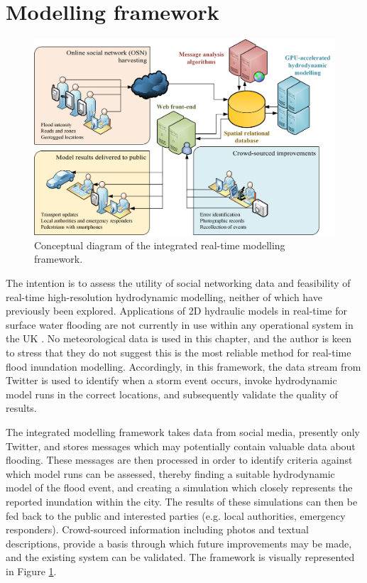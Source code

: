 \section{Modelling framework}

\begin{figure}[tpb]
	\centering
	\includegraphics[width=1.0\textwidth]{nowcasting-figures/nclsm-conceptual-diag.png}
	\caption{Conceptual diagram of the integrated real-time modelling framework.}
	\label{NclSM-Conceptual-Diag}
\end{figure}

The intention is to assess the utility of social networking data and feasibility of real-time high-resolution hydrodynamic modelling, neither of which have previously been explored. Applications of 2D hydraulic models in real-time for surface water flooding are not currently in use within any operational system in the UK \citep{Ghimire2013}. No meteorological data is used in this chapter, and the author is keen to stress that they do not suggest this is the most reliable method for real-time flood inundation modelling. Accordingly, in this framework, the data stream from Twitter is used to identify when a storm event occurs, invoke hydrodynamic model runs in the correct locations, and subsequently validate the quality of results.

The integrated modelling framework takes data from social media, presently only Twitter, and stores messages which may potentially contain valuable data about flooding. These messages are then processed in order to identify criteria against which model runs can be assessed, thereby finding a suitable hydrodynamic model of the flood event, and creating a simulation which closely represents the reported inundation within the city. The results of these simulations can then be fed back to the public and interested parties (e.g. local authorities, emergency responders). Crowd-sourced information including photos and textual descriptions, provide a basis through which future improvements may be made, and the existing system can be validated. The framework is visually represented in Figure \ref{NclSM-Conceptual-Diag}. 

